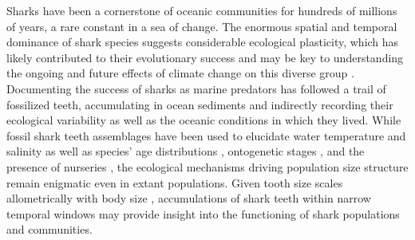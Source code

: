 \documentclass[]{rsos}%
\begin{document}
Sharks have been a cornerstone of oceanic communities for hundreds of millions of years, a rare constant in a sea of change.
The enormous spatial and temporal dominance of shark species suggests considerable ecological plasticity, which has likely contributed to their evolutionary success and may be key to understanding the ongoing and future effects of climate change on this diverse group \cite{Whitenack}.
Documenting the success of sharks as marine predators has followed a trail of fossilized teeth, accumulating in ocean sediments and indirectly recording their ecological variability as well as the oceanic conditions in which they lived.
While fossil shark teeth assemblages have been used to elucidate water temperature and salinity \cite{Kim2014d} as well as species' age distributions \cite{Kim2020}, ontogenetic stages \cite{straube2020intraspecific}, and the presence of nurseries \cite{Pimiento2010, Villafana2020}, the ecological mechanisms driving population size structure remain enigmatic even in extant populations.
Given tooth size scales allometrically with body size \cite{Shimada2004}, accumulations of shark teeth within narrow temporal windows may provide insight into the functioning of shark populations and communities.
\end{document}
